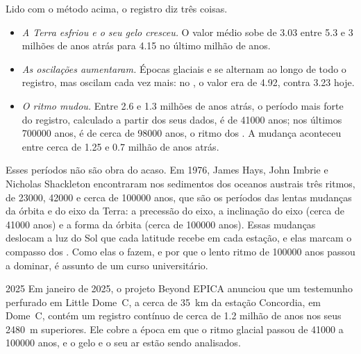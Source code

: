 Lido com o método acima, o registro diz três coisas.
\begin{itemize}
  \item \emph{A Terra esfriou e o seu gelo cresceu.} O valor médio sobe de
        \qty{3.03}{\permil} entre 5.3 e 3 milhões de anos atrás para
        \qty{4.15}{\permil} no último milhão de anos.
  \item \emph{As oscilações aumentaram.} Épocas glaciais e  se
        alternam ao longo de todo o registro, mas oscilam cada vez mais: no
        , o valor era de \qty{4.92}{\permil}, contra
        \qty{3.23}{\permil} hoje.
  \item \emph{O ritmo mudou.} Entre 2.6 e 1.3 milhões de anos atrás, o
        período mais forte do registro, calculado a partir dos seus dados, é
        de \num{41000} anos; nos últimos \num{700000} anos, é de cerca de
        \num{98000} anos, o ritmo dos . A mudança
        aconteceu entre cerca de 1.25 e 0.7 milhão de anos atrás.
\end{itemize}

Esses períodos não são obra do acaso. Em 1976, James Hays, John Imbrie e
Nicholas Shackleton encontraram nos sedimentos dos oceanos austrais três
ritmos, de \num{23000}, \num{42000} e cerca de \num{100000} anos, que são os
períodos das lentas mudanças da órbita e do eixo da Terra: a precessão do
eixo, a inclinação do eixo (cerca de \num{41000} anos) e a forma da órbita
(cerca de \num{100000} anos). Essas mudanças deslocam a luz do Sol que cada
latitude recebe em cada estação, e elas marcam o compasso dos . Como elas o fazem, e por que o lento ritmo de \num{100000} anos
passou a dominar, é assunto de um curso universitário.

\begin{dated}{2025}
Em janeiro de 2025, o projeto Beyond EPICA anunciou que um testemunho
perfurado em Little Dome~C, a cerca de \qty{35}{km} da estação Concordia, em
Dome~C, contém um registro contínuo de cerca de 1.2 milhão de anos nos seus
\qty{2480}{m} superiores. Ele cobre a época
em que o ritmo glacial passou de \num{41000} a \num{100000} anos, e o gelo e
o seu ar estão sendo analisados.
\end{dated}

